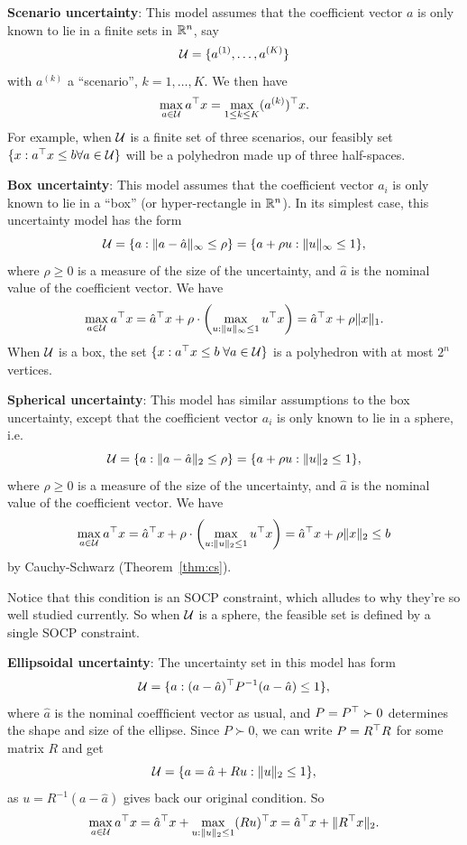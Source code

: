 \documentclass[11 pt]{scrartcl}
\begin{document}
\begin{itemize}
    \ii \textbf{Scenario uncertainty}: This model assumes that the coefficient vector $a$ is only known to lie in a finite sets in $\mathbb R^n$, say 
    \[ \mathcal U = \{a^{(1)}, \dots, a^{(K)}\}\]
    with $a^{(k)}$ a ``scenario'', $k = 1,\dots, K$. 
    We then have 
    \[ \max_{a\in \mathcal U} a^\top x = \max_{1\leq k \leq K} (a^{(k)})^\top x.\] 
    For example, when $\mathcal U$ is a finite set of three scenarios, our feasibly set $\{x: a^\top x \leq b \forall a\in \mathcal U\}$ will be a polyhedron made up of three half-spaces. 

    \ii \textbf{Box uncertainty}: This model assumes that the coefficient vector $a_i$ is only known to lie in a ``box'' (or hyper-rectangle in $\mathbb R^n$). 
    In its simplest case, this uncertainty model has the form 
    \[ \mathcal U = \{a : \|a-\hat{a}\|_\infty \leq \rho\} = \{a + \rho u : \|u\|_\infty \leq 1\},\] 
    where $\rho \geq 0$ is a measure of the size of the uncertainty, and $\hat{a}$ is the nominal value of the coefficient vector. 
    We have 
    \[ \max_{a\in \mathcal U} a^\top x = \hat{a}^\top x + \rho\cdot \left(\max_{u:\|u\|_\infty \leq 1} u^\top x\right) = \hat{a}^\top x + \rho\|x\|_1.\] 
    When $\mathcal U$ is a box, the set $\{x:a^\top x \leq b \; \forall a\in\mathcal U\}$ is a polyhedron with at most $2^n$ vertices.

    \ii \textbf{Spherical uncertainty}: This model has similar assumptions to the box uncertainty, except that the coefficient vector $a_i$ is only known to lie in a sphere, i.e. 
    \[ \mathcal U = \{a : \|a-\hat{a}\|_2 \leq \rho\} = \{a + \rho u : \|u\|_2 \leq 1\},\] 
    where $\rho \geq 0$ is a measure of the size of the uncertainty, and $\hat{a}$ is the nominal value of the coefficient vector. 
    We have 
    \[ \max_{a\in \mathcal U} a^\top x = \hat{a}^\top x + \rho\cdot \left(\max_{u:\|u\|_2 \leq 1} u^\top x\right) = \hat{a}^\top x + \rho\|x\|_2 \leq b\] 
    by Cauchy-Schwarz (Theorem~\ref{thm:cs}). 

    Notice that this condition is an SOCP constraint, which alludes to why they're so well studied currently. 
    So when $\mathcal U$ is a sphere, the feasible set is defined by a single SOCP constraint. 

    \ii \textbf{Ellipsoidal uncertainty}: The uncertainty set in this model has form 
    \[ \mathcal U = \{a : (a-\hat{a})^\top P^{-1} (a-\hat{a}) \leq 1\}, \] 
    where $\hat{a}$ is the nominal coeffficient vector as usual, and $P = P^\top \succ 0$ determines the shape and size of the ellipse. 
    Since $P\succ 0$, we can write $P = R^\top R$ for some matrix $R$ and get 
    \[ \mathcal U = \{a = \hat{a} + Ru : \|u\|_2 \leq 1\},\] 
    as $u = R^{-1}(a-\hat{a})$ gives back our original condition. 
    So 
    \[ \max_{a\in \mathcal U} a^\top x = \hat{a}^\top x + \max_{u: \|u\|_2 \leq 1} (Ru)^\top x = \hat{a}^\top x + \|R^\top x \|_2.\] 
\end{itemize}
\end{document}
